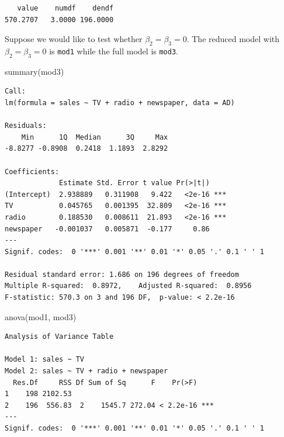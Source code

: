 \documentclass[
]{article}
\newenvironment{Shaded}{\begin{snugshade}}{\end{snugshade}}
\newcommand{\FunctionTok}[1]{\textcolor[rgb]{0.00,0.00,0.00}{#1}}
\newcommand{\NormalTok}[1]{#1}
\newcommand{\SpecialCharTok}[1]{\textcolor[rgb]{0.00,0.00,0.00}{#1}}
\begin{document}
\begin{Shaded}
\end{Shaded}

\begin{verbatim}
   value    numdf    dendf 
570.2707   3.0000 196.0000 
\end{verbatim}

Suppose we would like to test whether \(\beta_2 = \beta_3 = 0\). The reduced model with \(\beta_2 = \beta_3 = 0\) is \texttt{mod1} while the full model is \texttt{mod3}.

\begin{Shaded}
\begin{Highlighting}[]
\FunctionTok{summary}\NormalTok{(mod3)}
\end{Highlighting}
\end{Shaded}

\begin{verbatim}
Call:
lm(formula = sales ~ TV + radio + newspaper, data = AD)

Residuals:
    Min      1Q  Median      3Q     Max 
-8.8277 -0.8908  0.2418  1.1893  2.8292 

Coefficients:
             Estimate Std. Error t value Pr(>|t|)    
(Intercept)  2.938889   0.311908   9.422   <2e-16 ***
TV           0.045765   0.001395  32.809   <2e-16 ***
radio        0.188530   0.008611  21.893   <2e-16 ***
newspaper   -0.001037   0.005871  -0.177     0.86    
---
Signif. codes:  0 '***' 0.001 '**' 0.01 '*' 0.05 '.' 0.1 ' ' 1

Residual standard error: 1.686 on 196 degrees of freedom
Multiple R-squared:  0.8972,    Adjusted R-squared:  0.8956 
F-statistic: 570.3 on 3 and 196 DF,  p-value: < 2.2e-16
\end{verbatim}

\begin{Shaded}
\begin{Highlighting}[]
\FunctionTok{anova}\NormalTok{(mod1, mod3)}
\end{Highlighting}
\end{Shaded}

\begin{verbatim}
Analysis of Variance Table

Model 1: sales ~ TV
Model 2: sales ~ TV + radio + newspaper
  Res.Df     RSS Df Sum of Sq      F    Pr(>F)    
1    198 2102.53                                  
2    196  556.83  2    1545.7 272.04 < 2.2e-16 ***
---
Signif. codes:  0 '***' 0.001 '**' 0.01 '*' 0.05 '.' 0.1 ' ' 1
\end{verbatim}
\end{document}
